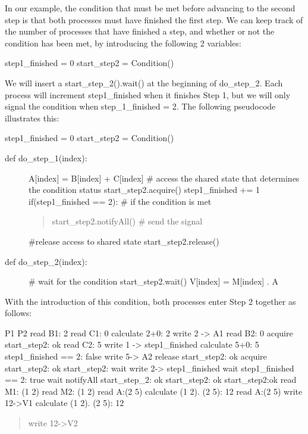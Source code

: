 \documentclass[letterpaper,10pt,dvipdfmx]{sphinxmanual}
\begin{document}
In our example, the condition that must be met before advancing to the second step is that both processes must have finished the first step. We can keep track of the number of processes that have finished a step, and whether or not the condition has been met, by introducing the following 2 variables:

step1\_finished = 0
start\_step2 = Condition()

We will insert a start\_step\_2().wait() at the beginning of do\_step\_2. Each process will increment step1\_finished when it finishes Step 1, but we will only signal the condition when step\_1\_finished = 2. The following pseudocode illustrates this:

step1\_finished = 0
start\_step2 = Condition()
\begin{description}
\item[{def do\_step\_1(index):}] \leavevmode
A{[}index{]} = B{[}index{]} + C{[}index{]}
\# access the shared state that determines the condition status
start\_step2.acquire()
step1\_finished += 1
if(step1\_finished == 2): \# if the condition is met
\begin{quote}

start\_step2.notifyAll() \# send the signal
\end{quote}

\#release access to shared state
start\_step2.release()

\item[{def do\_step\_2(index):}] \leavevmode
\# wait for the condition
start\_step2.wait()
V{[}index{]} = M{[}index{]} . A

\end{description}

With the introduction of this condition, both processes enter Step 2 together as follows:

P1                            P2
read B1: 2
read C1: 0
calculate 2+0: 2
write 2 -\textgreater{} A1                 read B2: 0
acquire start\_step2: ok       read C2: 5
write 1 -\textgreater{} step1\_finished     calculate 5+0: 5
step1\_finished == 2: false    write 5-\textgreater{} A2
release start\_step2: ok       acquire start\_step2: ok
start\_step2: wait             write 2-\textgreater{} step1\_finished
wait                          step1\_finished == 2: true
wait                          notifyAll start\_step\_2: ok
start\_step2: ok               start\_step2:ok
read M1: (1 2)                read M2: (1 2)
read A:(2 5)
calculate (1 2). (2 5): 12    read A:(2 5)
write 12-\textgreater{}V1                  calculate (1 2). (2 5): 12
\begin{quote}

write 12-\textgreater{}V2
\end{quote}
\end{document}
